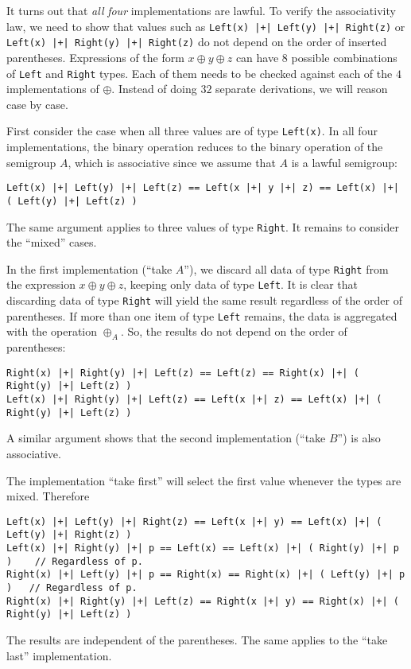 It turns out that \emph{all} \emph{four} implementations are lawful.
To verify the associativity law, we need to show that values such
as \lstinline!Left(x) |+| Left(y) |+| Right(z)! or \lstinline!Left(x) |+| Right(y) |+| Right(z)!
do not depend on the order of inserted parentheses. Expressions of
the form $x\oplus y\oplus z$ can have $8$ possible combinations
of \lstinline!Left! and \lstinline!Right! types. Each of them needs
to be checked against each of the $4$ implementations of $\oplus$.
Instead of doing $32$ separate derivations, we will reason case by
case.

First consider the case when all three values are of type \lstinline!Left(x)!.
In all four implementations, the binary operation reduces to the binary
operation of the semigroup $A$, which is associative since we assume
that $A$ is a lawful semigroup:
\begin{lstlisting}
Left(x) |+| Left(y) |+| Left(z) == Left(x |+| y |+| z) == Left(x) |+| ( Left(y) |+| Left(z) )
\end{lstlisting}

The same argument applies to three values of type \lstinline!Right!.
It remains to consider the \textsf{``}mixed\textsf{''} cases.

In the first implementation (\textsf{``}take $A$\textsf{''}), we discard all data
of type \lstinline!Right! from the expression $x\oplus y\oplus z$,
keeping only data of type \lstinline!Left!. It is clear that discarding
data of type \lstinline!Right! will yield the same result regardless
of the order of parentheses. If more than one item of type \lstinline!Left!
remains, the data is aggregated with the operation $\oplus_{A}$.
So, the results do not depend on the order of parentheses:
\begin{lstlisting}
Right(x) |+| Right(y) |+| Left(z) == Left(z) == Right(x) |+| ( Right(y) |+| Left(z) )
Left(x) |+| Right(y) |+| Left(z) == Left(x |+| z) == Left(x) |+| ( Right(y) |+| Left(z) )
\end{lstlisting}

A similar argument shows that the second implementation (\textsf{``}take $B$\textsf{''})
is also associative.

The implementation \textsf{``}take first\textsf{''} will select the first value whenever
the types are mixed. Therefore
\begin{lstlisting}[mathescape=true]
Left(x) |+| Left(y) |+| Right(z) == Left(x |+| y) == Left(x) |+| ( Left(y) |+| Right(z) )
Left(x) |+| Right(y) |+| p == Left(x) == Left(x) |+| ( Right(y) |+| p )    // Regardless of p.
Right(x) |+| Left(y) |+| p == Right(x) == Right(x) |+| ( Left(y) |+| p )   // Regardless of p.
Right(x) |+| Right(y) |+| Left(z) == Right(x |+| y) == Right(x) |+| ( Right(y) |+| Left(z) )
\end{lstlisting}
The results are independent of the parentheses. The same applies to
the \textsf{``}take last\textsf{''} implementation.

